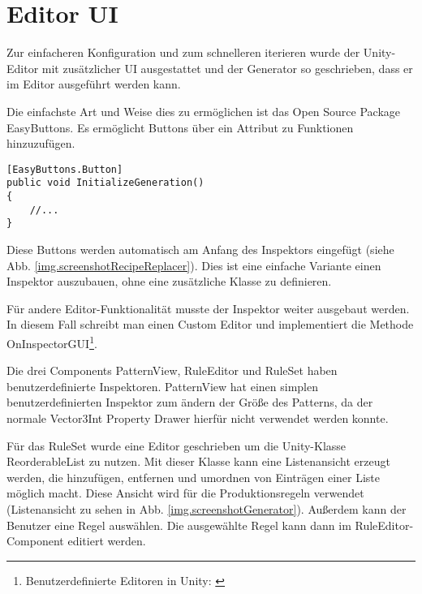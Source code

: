 
\section{Editor UI}\label{s.editorUI}

Zur einfacheren Konfiguration und zum schnelleren iterieren wurde der Unity-Editor mit zusätzlicher UI ausgestattet und der Generator so geschrieben, dass er im Editor ausgeführt werden kann. 

Die einfachste Art und Weise dies zu ermöglichen ist das Open Source Package EasyButtons. Es ermöglicht Buttons über ein Attribut zu Funktionen hinzuzufügen.

\begin{lstlisting}[label=l.buttonAttribute, caption={Beispiel eines EasyButtons-Attributs}] 
[EasyButtons.Button]
public void InitializeGeneration()
{
    //...
}
\end{lstlisting}

Diese Buttons werden automatisch am Anfang des Inspektors eingefügt (siehe Abb. \ref{img.screenshotRecipeReplacer}). Dies ist eine einfache Variante einen Inspektor auszubauen, ohne eine zusätzliche Klasse zu definieren.


Für andere Editor-Funktionalität musste der Inspektor weiter ausgebaut werden. In diesem Fall schreibt man einen Custom Editor und implementiert die Methode OnInspectorGUI\footnote{Benutzerdefinierte Editoren in Unity: \cite[Seite: editor-CustomEditors]{unityManual}}.

Die drei Components PatternView, RuleEditor und RuleSet haben benutzerdefinierte Inspektoren. PatternView hat einen simplen benutzerdefinierten Inspektor zum ändern der Größe des Patterns, da der normale Vector3Int Property Drawer hierfür nicht verwendet werden konnte. 

Für das RuleSet wurde eine Editor geschrieben um die Unity-Klasse ReorderableList zu nutzen. Mit dieser Klasse kann eine Listenansicht erzeugt werden, die hinzufügen, entfernen und umordnen von Einträgen einer Liste möglich macht. Diese Ansicht wird für die Produktionsregeln verwendet (Listenansicht zu sehen in Abb. \ref{img.screenshotGenerator}). Außerdem kann der Benutzer eine Regel auswählen. Die ausgewählte Regel kann dann im RuleEditor-Component editiert werden.

